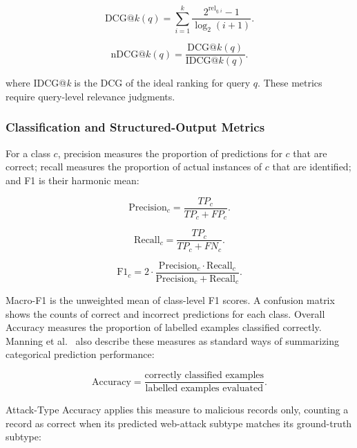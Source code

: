 \begin{equation}
\mathrm{DCG@}k(q) = \sum_{i=1}^{k}
\frac{2^{\mathrm{rel}_{q,i}}-1}{\log_2(i+1)}.
\end{equation}

\begin{equation}
\mathrm{nDCG@}k(q) =
\frac{\mathrm{DCG@}k(q)}{\mathrm{IDCG@}k(q)}.
\end{equation}

where IDCG@\emph{k} is the DCG of the ideal ranking for query $q$.
These metrics require query-level relevance judgments.

\subsubsection{Classification and Structured-Output Metrics}

For a class $c$, precision measures the proportion of predictions for
$c$ that are correct; recall measures the proportion of actual instances
of $c$ that are identified; and F1 is their harmonic mean:

\begin{equation}
\mathrm{Precision}_c = \frac{TP_c}{TP_c + FP_c}.
\end{equation}

\begin{equation}
\mathrm{Recall}_c = \frac{TP_c}{TP_c + FN_c}.
\end{equation}

\begin{equation}
\mathrm{F1}_c = 2 \cdot
\frac{\mathrm{Precision}_c \cdot \mathrm{Recall}_c}
{\mathrm{Precision}_c + \mathrm{Recall}_c}.
\end{equation}

Macro-F1 is the unweighted mean of class-level F1 scores. A confusion
matrix shows the counts of correct and incorrect predictions for each
class. Overall Accuracy measures the proportion of labelled examples
classified correctly. Manning et al.~\cite{manning2008ir} also describe
these measures as standard ways of summarizing categorical prediction
performance:

\begin{equation}
\mathrm{Accuracy} =
\frac{\text{correctly classified examples}}
{\text{labelled examples evaluated}}.
\end{equation}

Attack-Type Accuracy applies this measure to malicious records only,
counting a record as correct when its predicted web-attack subtype
matches its ground-truth subtype:

